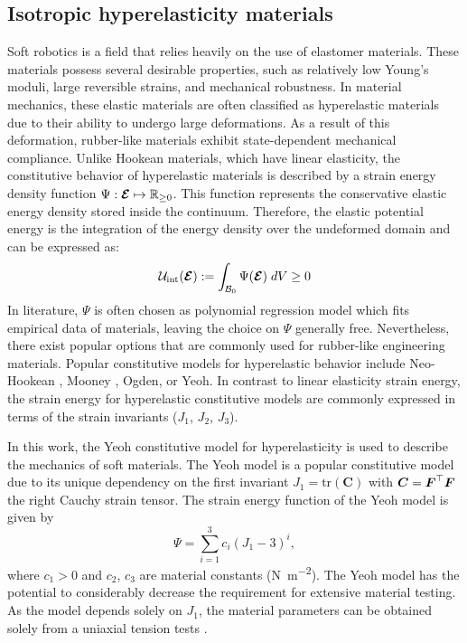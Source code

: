 \subsection{Isotropic hyperelasticity materials}
Soft robotics is a field that relies heavily on the use of elastomer materials. These materials possess several desirable properties, such as relatively low Young's moduli, large reversible strains, and mechanical robustness. In material mechanics, these elastic materials are often classified as hyperelastic materials due to their ability to undergo large deformations. As a result of this deformation, rubber-like materials exhibit state-dependent mechanical compliance. Unlike Hookean materials, which have linear elasticity, the constitutive behavior of hyperelastic materials is described by a strain energy density function ${\Psi}: \boldsymbol{\mathcal{E}} \mapsto \mathbb{R}_{\ge0}$. This function represents the conservative elastic energy density stored inside the continuum. Therefore, the elastic potential energy is the integration of the energy density over the undeformed domain and can be expressed as:
%
\begin{equation}
\mathcal{U}_{\textrm{int}}(\boldsymbol{\mathcal{E}}):= \int_{\mathcal{B}_0} \Psi(\boldsymbol{\mathcal{E}})\; dV \ge 0
\end{equation}
%
In literature, $\Psi$ is often chosen as polynomial regression model which fits empirical data of materials, leaving the choice on $\Psi$ generally free. Nevertheless, there exist popular options that are commonly used for rubber-like engineering materials. Popular constitutive models for hyperelastic behavior include Neo-Hookean \cite{Smith2018,Bern2019,Bern2021Apr}, Mooney \cite{Kim2018}, Ogden\cite{Xavier2022Jun}, or Yeoh\cite{Renaud2011}. In contrast to linear elasticity strain energy, the strain energy for hyperelastic constitutive models are commonly expressed in terms of the strain invariants (${J}_1$, ${J}_2$, ${J}_3$).

In this work, the Yeoh constitutive model for hyperelasticity is used to describe the mechanics of soft materials. The Yeoh model is a popular constitutive model due to its unique dependency on the first invariant $J_1 = \text{tr}(\boldsymbol{C})$ with ${\boldsymbol{C}} = {\boldsymbol{F}}^\top {\boldsymbol{F}}$ the right Cauchy strain tensor. The strain energy function of the Yeoh model \cite{Kim2018} is given by
%
\begin{equation}
{\Psi} = \sum_{i = 1}^{3} c_i (J_1 - 3)^i, 
\label{eq:C3:psi_model_yeoh}
\end{equation}
%
where $c_1 > 0$ and $c_2$, $c_3$ are material constants (\si{\newton \per \square \meter  }). The Yeoh model has the potential to considerably decrease the requirement for extensive material testing. As the model depends solely on $J_1$, the material parameters can be obtained solely from a uniaxial tension tests \cite{Renaud2011}. 

